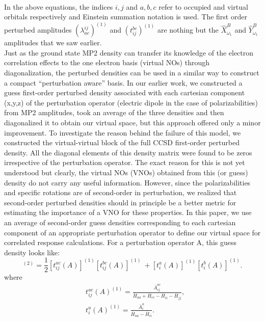\\
In the above equations, the indices $i,j$ and $a,b,c$ refer to occupied and virtual orbitals respectively
and Einstein summation notation is used. The first order perturbed amplitudes $(\lambda^{ij}_{ac})^{(1)}$ 
and $(t^{bc}_{ij})^{(1)}$ are nothing but the $\hat{X}^{B}_{\omega_1}$ and $\hat{Y}^{B}_{\omega_1}$ 
amplitudes that we saw earlier.\\ Just as the ground state MP2 density can transfer its knowledge of 
the electron correlation effects to the one electron basis (virtual NOs) through diagonalization, 
the perturbed densities can be used in a similar way to construct a compact ``perturbation aware''
basis. In our earlier work, we constructed a guess first-order perturbed density associated  
with each cartesian component (x,y,z) of the perturbation operator (electric dipole in the case of polarizabilities)
from MP2 amplitudes, took an average of the three densities and then diagonalized it to obtain our 
virtual space, but this approach offered only a minor improvement\cite{Kumar17}.
To investigate the reason behind the failure of this model, we constructed the virtual-virtual
block of the full CCSD first-order perturbed density. All the diagonal elements of this density 
matrix were found to be zeros irrespective of the perturbation operator. The exact reason for this
is not yet understood but clearly, the virtual NOs (VNOs) obtained from this (or guess) density 
do not carry any useful information. However, since the polarizabilities and specific rotations are 
of second-order in perturbation, we realized that second-order perturbed densities should in principle be a better 
metric for estimating the importance of a VNO for these properties.
In this paper, we use an average of second-order guess densities corresponding to each cartesian
component of an appropriate perturbation operator to define our virtual space 
for correlated response calculations. For a perturbation operator A, this guess density looks like:
\\
\begin{equation}
[{D^A_{ab}}]^{(2)} = \frac{1}{2}[t^{ac}_{ij}(A)]^{(1)}[t^{bc}_{ij}(A)]^{(1)} \
+ [t^{a}_{i}(A)]^{(1)} [t^{b}_{i}(A)]^{(1)}.
\end{equation}
where
\begin{equation}
\begin{split}
& t^{ac}_{ij}(A)^{(1)} = \frac{\bar{A}^{ac}_{ij}}{\overbar{H}_{aa} + \overbar{H}_{cc} - \overbar{H}_{ii} - \overbar{H}_{jj}},\\
& t^{a}_{i}(A)^{(1)} = \frac{\bar{A}^{a}_{i}}{\overbar{H}_{aa} - \overbar{H}_{ii}}.\\
\end{split}
\end{equation}
